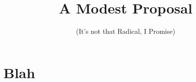 \documentclass{essay}
\title{A Modest Proposal}
\subtitle{(It's not that Radical, I Promise)}
\begin{document}
\maketitle

\begin{abstract}
\lipsum[2]
\end{abstract}

\section*{Blah}
\lipsum[5]

\cite{ah2006}



\end{document}
